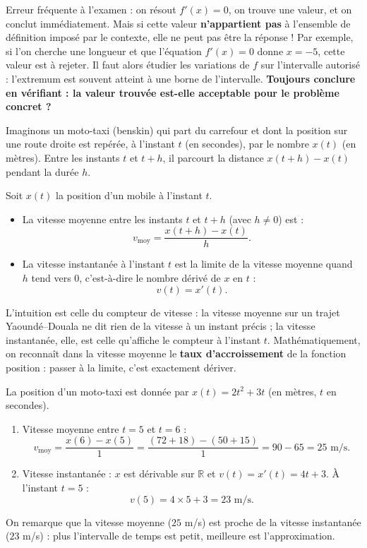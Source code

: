 \documentclass[11pt]{article}
\newcommand{\cle}[1]{{\popxbold\color{popdark}#1}}
\newcounter{popsec}
\newcounter{popsub}
\newcommand{\courssub}[1]{%
  \stepcounter{popsub}%
  \par\vspace{9pt}\noindent{\popxbold\fontsize{11.5}{13}\selectfont\color{popink}{\color{poporange}\thepopsec.\thepopsub}\hspace{6pt}#1}\par\nopagebreak\vspace{4pt}
}
\begin{document}
\begin{attention}
Erreur fréquente à l'examen : on résout $f'(x) = 0$, on trouve une valeur, et on conclut immédiatement. Mais si cette valeur \textbf{n'appartient pas} à l'ensemble de définition imposé par le contexte, elle ne peut pas être la réponse ! Par exemple, si l'on cherche une longueur et que l'équation $f'(x) = 0$ donne $x = -5$, cette valeur est à rejeter. Il faut alors étudier les variations de $f$ sur l'intervalle autorisé : l'extremum est souvent atteint à une borne de l'intervalle. \textbf{Toujours conclure en vérifiant : la valeur trouvée est-elle acceptable pour le problème concret ?}
\end{attention}

\courssub{Vitesse moyenne et vitesse instantanée}

Imaginons un moto-taxi (benskin) qui part du carrefour et dont la position sur une route droite est repérée, à l'instant $t$ (en secondes), par le nombre $x(t)$ (en mètres). Entre les instants $t$ et $t + h$, il parcourt la distance $x(t+h) - x(t)$ pendant la durée $h$.

\begin{definition}
Soit $x(t)$ la position d'un mobile à l'instant $t$.
\begin{itemize}
\item La \cle{vitesse moyenne} entre les instants $t$ et $t + h$ (avec $h \neq 0$) est :
\[ v_{\text{moy}} = \frac{x(t+h) - x(t)}{h}. \]
\item La \cle{vitesse instantanée} à l'instant $t$ est la limite de la vitesse moyenne quand $h$ tend vers $0$, c'est-à-dire le nombre dérivé de $x$ en $t$ :
\[ v(t) = x'(t). \]
\end{itemize}
\end{definition}

L'intuition est celle du compteur de vitesse : la vitesse moyenne sur un trajet Yaoundé--Douala ne dit rien de la vitesse à un instant précis ; la vitesse instantanée, elle, est celle qu'affiche le compteur à l'instant $t$. Mathématiquement, on reconnaît dans la vitesse moyenne le \textbf{taux d'accroissement} de la fonction position : passer à la limite, c'est exactement dériver.

\begin{exemplebox}
La position d'un moto-taxi est donnée par $x(t) = 2t^{2} + 3t$ (en mètres, $t$ en secondes).
\begin{enumerate}
\item Vitesse moyenne entre $t = 5$ et $t = 6$ :
\[ v_{\text{moy}} = \frac{x(6) - x(5)}{1} = \frac{(72 + 18) - (50 + 15)}{1} = 90 - 65 = 25 \text{ m/s}. \]
\item Vitesse instantanée : $x$ est dérivable sur $\mathbb{R}$ et $v(t) = x'(t) = 4t + 3$. À l'instant $t = 5$ :
\[ v(5) = 4 \times 5 + 3 = 23 \text{ m/s}. \]
\end{enumerate}
On remarque que la vitesse moyenne ($25$ m/s) est proche de la vitesse instantanée ($23$ m/s) : plus l'intervalle de temps est petit, meilleure est l'approximation.
\end{exemplebox}
\end{document}
